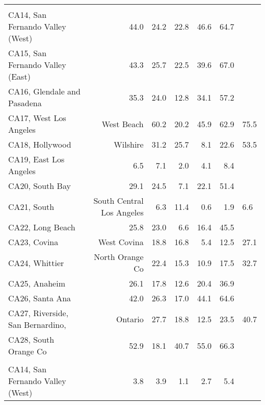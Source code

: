 \begin{longtable}[l]{l|rrrrr}
\endfoot
\bottomrule
\endlastfoot
\addlinespace[0.5em]
\\
\hspace{1em}CA14, San Fernando Valley (West) & 44.0 & 24.2 & 22.8 & 46.6 & 64.7\\
\hspace{1em}CA15, San Fernando Valley (East) & 43.3 & 25.7 & 22.5 & 39.6 & 67.0\\
\hspace{1em}CA16, Glendale and Pasadena & 35.3 & 24.0 & 12.8 & 34.1 & 57.2\\
\hspace{1em}CA17, West Los Angeles & West Beach & 60.2 & 20.2 & 45.9 & 62.9 & 75.5\\
\hspace{1em}CA18, Hollywood & Wilshire & 31.2 & 25.7 & 8.1 & 22.6 & 53.5\\
\hspace{1em}CA19, East Los Angeles & 6.5 & 7.1 & 2.0 & 4.1 & 8.4\\
\hspace{1em}CA20, South Bay & 29.1 & 24.5 & 7.1 & 22.1 & 51.4\\
\hspace{1em}CA21, South & South Central Los Angeles & 6.3 & 11.4 & 0.6 & 1.9 & 6.6\\
\hspace{1em}CA22, Long Beach & 25.8 & 23.0 & 6.6 & 16.4 & 45.5\\
\hspace{1em}CA23, Covina & West Covina & 18.8 & 16.8 & 5.4 & 12.5 & 27.1\\
\hspace{1em}CA24, Whittier & North Orange Co & 22.4 & 15.3 & 10.9 & 17.5 & 32.7\\
\hspace{1em}CA25, Anaheim & 26.1 & 17.8 & 12.6 & 20.4 & 36.9\\
\hspace{1em}CA26, Santa Ana & 42.0 & 26.3 & 17.0 & 44.1 & 64.6\\
\hspace{1em}CA27, Riverside, San Bernardino, & Ontario & 27.7 & 18.8 & 12.5 & 23.5 & 40.7\\
\hspace{1em}CA28, South Orange Co & 52.9 & 18.1 & 40.7 & 55.0 & 66.3\\
\addlinespace[0.5em]
\\
\hspace{1em}CA14, San Fernando Valley (West) & 3.8 & 3.9 & 1.1 & 2.7 & 5.4\\

\end{longtable}
